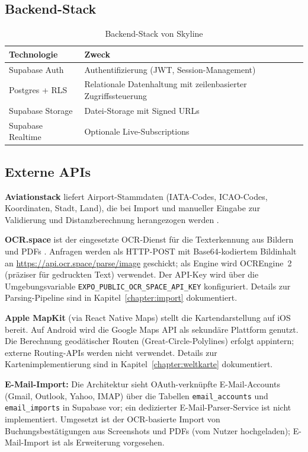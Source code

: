 \subsection{Backend-Stack}

\begin{table}[H]
  \centering
  \caption{Backend-Stack von Skyline}
  \label{tab:backend_stack}
  \begin{tabular}{p{4.2cm}p{8.5cm}}
  \toprule
  \textbf{Technologie} & \textbf{Zweck} \\
  \midrule
  Supabase Auth & Authentifizierung (JWT, Session-Management) \\
  Postgres + RLS & Relationale Datenhaltung mit zeilenbasierter Zugriffssteuerung \cite{supabaseRLS} \\
  Supabase Storage & Datei-Storage mit Signed URLs \cite{supabaseStorage} \\
  Supabase Realtime & Optionale Live-Subscriptions \\
  \bottomrule
  \end{tabular}
\end{table}

\subsection{Externe APIs}

\textbf{Aviationstack} liefert Airport-Stammdaten (IATA-Codes, ICAO-Codes, Koordinaten,
Stadt, Land), die bei Import und manueller Eingabe zur Validierung und
Distanzberechnung herangezogen werden \cite{aviationstack}.

\textbf{OCR.space} ist der eingesetzte OCR-Dienst für die Texterkennung aus Bildern und
PDFs \cite{ocrSpace}. Anfragen werden als HTTP-POST mit Base64-kodiertem Bildinhalt an
\url{https://api.ocr.space/parse/image} geschickt; als Engine wird OCREngine~2 (präziser
für gedruckten Text) verwendet. Der API-Key wird über die Umgebungsvariable
\texttt{EXPO\_PUBLIC\_OCR\_SPACE\_API\_KEY} konfiguriert. Details zur Parsing-Pipeline sind in
Kapitel~\ref{chapter:import} dokumentiert.

\textbf{Apple MapKit} (via React Native Maps) stellt die Kartendarstellung auf iOS bereit.
Auf Android wird die Google Maps API als sekundäre Plattform genutzt. Die Berechnung
geodätischer Routen (Great-Circle-Polylines) erfolgt appintern; externe
Routing-APIs werden nicht verwendet. Details zur Kartenimplementierung sind in
Kapitel~\ref{chapter:weltkarte} dokumentiert.

\textbf{E-Mail-Import:} Die Architektur sieht OAuth-verknüpfte E-Mail-Accounts
(Gmail, Outlook, Yahoo, IMAP) über die Tabellen \texttt{email\_accounts} und
\texttt{email\_imports} in Supabase vor; ein dedizierter E-Mail-Parser-Service ist
nicht implementiert. Umgesetzt ist der OCR-basierte Import von Buchungsbestätigungen
aus Screenshots und PDFs (vom Nutzer hochgeladen); E-Mail-Import ist als Erweiterung
vorgesehen.

